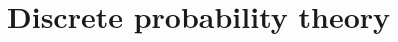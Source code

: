 \chapter{Discrete probability theory}
\label{chProbabilityTheory}



\newpage


\newpage


% 


\chexend